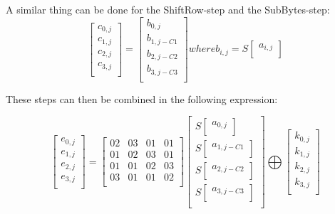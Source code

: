 \documentclass{article}
\begin{document}
A similar thing can be done for the ShiftRow-step and the SubBytes-step:
\[
\begin{bmatrix}
c_{0,j} \\
c_{1,j} \\
c_{2,j} \\
c_{3,j} \\
\end{bmatrix}
=
\begin{bmatrix}
b_{0,j} \\
b_{1,j-C1} \\
b_{2,j-C2} \\
b_{3,j-C3} \\
\end{bmatrix}
where
b_{i,j} = S
\begin{bmatrix}
a_{i,j} \\
\end{bmatrix}
\]

These steps can then be combined in the following expression:

\[
\begin{bmatrix}
e_{0,j} \\
e_{1,j} \\
e_{2,j} \\
e_{3,j} \\
\end{bmatrix}
=
\begin{bmatrix}
02 & 03 & 01 & 01 \\
01 & 02 & 03 & 01 \\
01 & 01 & 02 & 03 \\
03 & 01 & 01 & 02 \\
\end{bmatrix}
\begin{bmatrix}
S
\begin{bmatrix}
a_{0,j} \\
\end{bmatrix} \\
S
\begin{bmatrix}
a_{1,j-C1} \\
\end{bmatrix} \\
S
\begin{bmatrix}
a_{2,j-C2} \\
\end{bmatrix} \\
S
\begin{bmatrix}
a_{3,j-C3} \\
\end{bmatrix}\\
\end{bmatrix}
\bigoplus
\begin{bmatrix}
k_{0,j} \\
k_{1,j} \\
k_{2,j} \\
k_{3,j} \\
\end{bmatrix}
\]
\end{document}
